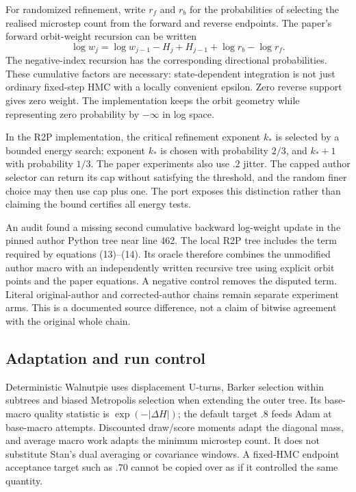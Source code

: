 For randomized refinement, write $r_f$ and $r_b$ for the probabilities of
selecting the realised microstep count from the forward and reverse endpoints.
The paper's forward orbit-weight recursion can be written
\begin{equation}
 \log w_j=\log w_{j-1}-H_j+H_{j-1}+\log r_b-\log r_f.
 \label{eq:sw-orbit-weight}
\end{equation}
The negative-index recursion has the corresponding directional probabilities.
These cumulative factors are necessary: state-dependent integration is not
just ordinary fixed-step HMC with a locally convenient epsilon. Zero reverse
support gives zero weight. The implementation keeps the orbit geometry while
representing zero probability by $-\infty$ in log space.

In the R2P implementation, the critical refinement exponent $k_*$ is selected
by a bounded energy search; exponent $k_*$ is chosen with probability $2/3$,
and $k_*+1$ with probability $1/3$. The paper experiments also use $.2$
jitter. The capped author selector can return its cap without satisfying
the threshold, and the random finer choice may then use cap plus one.
The port exposes this distinction rather than claiming the bound certifies
all energy tests.

An audit found a missing second cumulative backward log-weight update in
the pinned author Python tree near line 462. The local R2P tree includes
the term required by equations (13)--(14). Its oracle therefore combines
the unmodified author macro with an independently written recursive tree
using explicit orbit points and the paper equations. A negative control
removes the disputed term. Literal original-author and corrected-author
chains remain separate experiment arms. This is a documented source
difference, not a claim of bitwise agreement with the original whole chain.

\subsection{Adaptation and run control}

Deterministic Walnutpie uses displacement U-turns, Barker selection within
subtrees and biased Metropolis selection when extending the outer tree.
Its base-macro quality statistic is $\exp(-|\Delta H|)$; the default
target $.8$ feeds Adam at base-macro attempts. Discounted draw/score moments
adapt the diagonal mass, and average macro work adapts the minimum microstep
count. It does not substitute Stan's dual averaging or covariance windows.
A fixed-HMC endpoint acceptance target such as $.70$ cannot be copied over
as if it controlled the same quantity.

